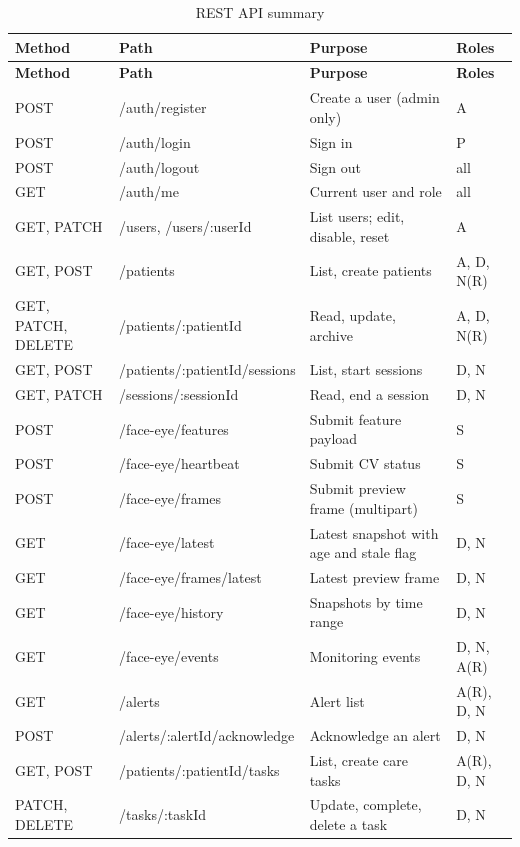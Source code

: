 \documentclass[a4paper,11pt]{scrreprt}
\begin{document}
\begin{longtable}{@{}>{\ttfamily\footnotesize}p{1.7cm}>{\ttfamily\footnotesize}p{5.4cm}>{\raggedright\arraybackslash}p{4.9cm}>{\raggedright\arraybackslash}p{2.2cm}@{}}
\caption{REST API summary}\label{tab:api}\\
\toprule \textbf{Method} & \textbf{Path} & \textbf{Purpose} & \textbf{Roles}\\ \midrule \endfirsthead
\toprule \textbf{Method} & \textbf{Path} & \textbf{Purpose} & \textbf{Roles}\\ \midrule \endhead
\bottomrule \endfoot
POST & /auth/register & Create a user (admin only) & A\\
POST & /auth/login & Sign in & P\\
POST & /auth/logout & Sign out & all\\
GET & /auth/me & Current user and role & all\\
GET, PATCH & /users, /users/:userId & List users; edit, disable, reset & A\\
GET, POST & /patients & List, create patients & A, D, N(R)\\
GET, PATCH, DELETE & /patients/:patientId & Read, update, archive & A, D, N(R)\\
GET, POST & /patients/:patientId/sessions & List, start sessions & D, N\\
GET, PATCH & /sessions/:sessionId & Read, end a session & D, N\\
POST & /face-eye/features & Submit feature payload & S\\
POST & /face-eye/heartbeat & Submit CV status & S\\
POST & /face-eye/frames & Submit preview frame (multipart) & S\\
GET & /face-eye/latest & Latest snapshot with age and stale flag & D, N\\
GET & /face-eye/frames/latest & Latest preview frame & D, N\\
GET & /face-eye/history & Snapshots by time range & D, N\\
GET & /face-eye/events & Monitoring events & D, N, A(R)\\
GET & /alerts & Alert list & A(R), D, N\\
POST & /alerts/:alertId/acknowledge & Acknowledge an alert & D, N\\
GET, POST & /patients/:patientId/tasks & List, create care tasks & A(R), D, N\\
PATCH, DELETE & /tasks/:taskId & Update, complete, delete a task & D, N\\

\end{longtable}
\end{document}
